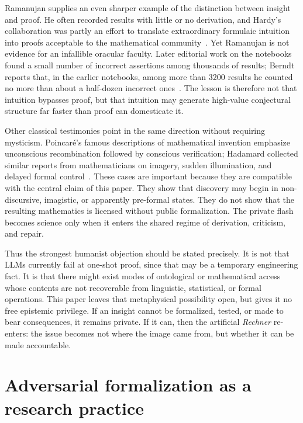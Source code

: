 \documentclass[
  aps,
  reprint,
  superscriptaddress,
  floatfix,
  nofootinbib,
  longbibliography
]{revtex4-2}
\begin{document}
Ramanujan supplies an even sharper example of the distinction between insight
and proof. He often recorded results with little or no derivation, and Hardy's
collaboration was partly an effort to translate extraordinary formulaic
intuition into proofs acceptable to the mathematical community~\cite{hardy1940ramanujan}. Yet Ramanujan is not evidence for an infallible
oracular faculty. Later editorial work on the notebooks found a small number of
incorrect assertions among thousands of results; Berndt reports that, in the
earlier notebooks, among more than 3200 results he counted no more than about a
half-dozen incorrect ones~\cite{berndt1998ramanujan,berndt2020living}. The lesson
is therefore not that intuition bypasses proof, but that intuition may generate
high-value conjectural structure far faster than proof can domesticate it.

Other classical testimonies point in the same direction without requiring
mysticism. Poincar\'e's famous descriptions of mathematical invention emphasize
unconscious recombination followed by conscious verification; Hadamard collected
similar reports from mathematicians on imagery, sudden illumination, and delayed
formal control~\cite{poincare1908science,hadamard1945psychology}. These cases are
important because they are compatible with the central claim of this paper. They
show that discovery may begin in non-discursive, imagistic, or apparently
pre-formal states. They do not show that the resulting mathematics is licensed
without public formalization. The private flash becomes science only when it
enters the shared regime of derivation, criticism, and repair.

Thus the strongest humanist objection should be stated precisely. It is not that
LLMs currently fail at one-shot proof, since that may be a temporary engineering
fact. It is that there might exist modes of ontological or mathematical access
whose contents are not recoverable from linguistic, statistical, or formal
operations. This paper leaves that metaphysical possibility open, but gives it no
free epistemic privilege. If an insight cannot be formalized, tested, or made to
bear consequences, it remains private. If it can, then the artificial
\emph{Rechner} re-enters: the issue becomes not where the image came from, but
whether it can be made accountable.

\section{Adversarial formalization as a research practice}
\label{sec:protocol}
\end{document}
